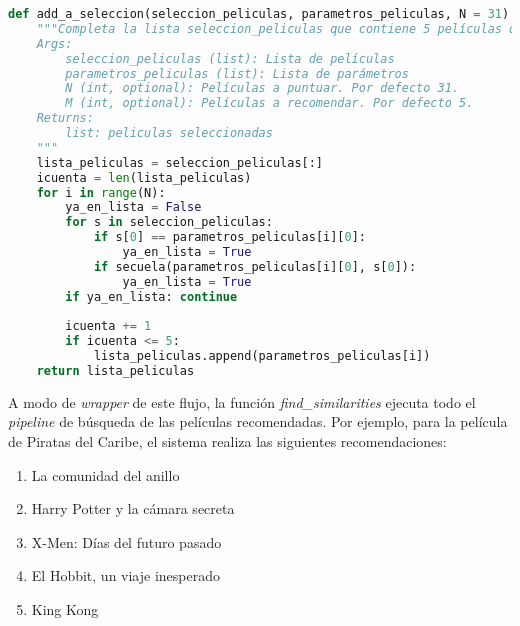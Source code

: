 \begin{lstlisting}[language=Python, caption={Esta función se encarga de completar la selección de las 5 películas que se recomendarán. Completa la lista seleccion\_peliculas que contiene 5 películas que se recomendarán al usuario. Las películas son seleccionadas de parametros\_películas y sólo se tienen en cuenta si el título es suficientemente distinto del de otras películas.}]
def add_a_seleccion(seleccion_peliculas, parametros_peliculas, N = 31):
    """Completa la lista seleccion_peliculas que contiene 5 películas que se recomendarán al usuario. Las películas son seleccionadas de parametros_películas y sólo se tienen en cuenta si el título es suficientemente distinto del de otras películas.
    Args:
        seleccion_peliculas (list): Lista de películas
        parametros_peliculas (list): Lista de parámetros
        N (int, optional): Películas a puntuar. Por defecto 31.
        M (int, optional): Películas a recomendar. Por defecto 5.
    Returns:
        list: peliculas seleccionadas
    """
    lista_peliculas = seleccion_peliculas[:]
    icuenta = len(lista_peliculas)    
    for i in range(N):
        ya_en_lista = False
        for s in seleccion_peliculas:
            if s[0] == parametros_peliculas[i][0]: 
                ya_en_lista = True
            if secuela(parametros_peliculas[i][0], s[0]): 
                ya_en_lista = True            
        if ya_en_lista: continue
            
        icuenta += 1
        if icuenta <= 5:
            lista_peliculas.append(parametros_peliculas[i])
    return lista_peliculas
\end{lstlisting}

A modo de \textit{wrapper} de este flujo, la función \textit{find\_similarities} ejecuta todo el \textit{pipeline} de búsqueda de las películas recomendadas. Por ejemplo, para la película de Piratas del Caribe, el sistema realiza las siguientes recomendaciones:

\begin{enumerate}
    \item La comunidad del anillo
    \item Harry Potter y la cámara secreta
    \item X-Men: Días del futuro pasado
    \item El Hobbit, un viaje inesperado
    \item King Kong
\end{enumerate}

